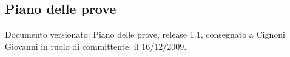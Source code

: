 \subsection{Piano delle prove}
Documento versionato: Piano delle prove, release 1.1, consegnato a Cignoni
Giovanni in ruolo di committente, il 16/12/2009.
